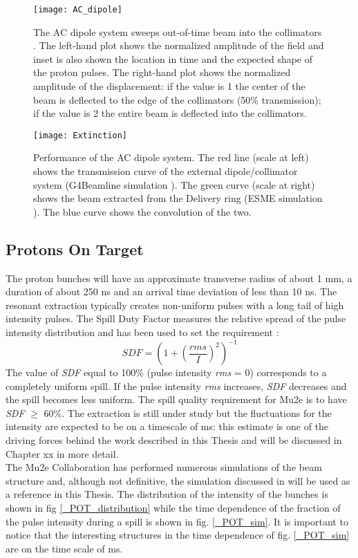 \documentclass[12pt,a4paper,openright, oneside, titlepage]{book} %
\begin{document}
\begin{figure}[h!]
\centering
\texttt{[image: AC\_dipole]}
\caption{The AC dipole system sweeps out-of-time beam into the collimators \cite{bob_mu2e}. 
The left-hand plot shows the normalized amplitude of the field and inset is also shown
the location in time and the expected shape of the proton pulses. 
The right-hand plot shows the normalized amplitude of the displacement: 
if the value is 1 the center of the beam is deflected to the edge of the collimators (50\% transmission); 
if the value is 2 the entire beam is deflected into the collimators.}
\label{_AC_dipole}
\end{figure}

\begin{figure}[h!]
\centering
\texttt{[image: Extinction]}
\caption{Performance of the AC dipole system\cite{bob_mu2e}. The red line (scale at left) shows the transmission curve of the external dipole/collimator system (G4Beamline simulation \cite{G4beamline}). The green curve (scale at right) shows the beam extracted from the Delivery ring (ESME simulation \cite{ESME}). The blue curve shows the convolution of the two.}
\label{_Extinction}
\end{figure}

\subsection{Protons On Target}
The proton bunches will have an approximate transverse radius of about 1 mm, a duration of about 250 ns and an arrival time deviation of less than 10 ns.
The resonant extraction typically creates non-uniform pulses with a long tail of high intensity pulses. 
The Spill Duty Factor measures the relative spread of the pulse intensity distribution and has been used to set the requirement \cite{BeamRequirements}:
$$SDF=\left(1+\left(\frac{rms}{I}\right)^2\right)^{-1}$$
The value of {\em SDF} equal to 100\% (pulse intensity {\em rms} = 0) corresponds to a completely uniform spill. 
If the pulse intensity {\em rms} increases, {\em SDF} decreases and the spill becomes less uniform.
The spill quality requirement for Mu2e is to have {\em SDF} $\geqslant$  60\%.
The extraction is still under study but the fluctuations for the intensity are expected to be on a timescale of ms: 
this estimate is one of the driving forces behind the work described in this Thesis and will be discussed 
in Chapter xx in more detail.\\
The Mu2e Collaboration has performed numerous simulations of the beam structure and, although not definitive, the simulation discussed in \cite{SpillSim} will be used as a reference in this Thesis. 
The distribution of the intensity of the bunches is shown in fig \ref{_POT_distribution} while the time dependence of the fraction of the pulse intensity during a spill is shown in fig. \ref{_POT_sim}. 
It is important to notice that the interesting structures in the time dependence of fig. \ref{_POT_sim} are on the time scale of ms.
\label{_Fluctuations}
\end{document}
